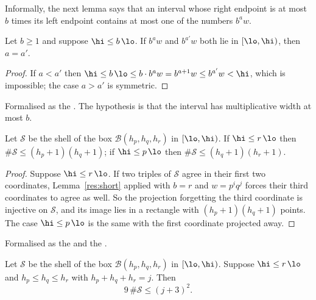 Informally, the next lemma says that an interval whose right endpoint is at
most $b$ times its left endpoint contains at most one of the numbers $b^{a}w$.

\begin{lemma}\label{res:short}
Let $b\ge1$ and suppose $\hi\le b\,\lo$.  If $b^{a}w$ and $b^{a'}w$ both lie in
$[\lo,\hi)$, then $a=a'$.
\end{lemma}

\begin{proof}
If $a<a'$ then $\hi\le b\,\lo\le b\cdot b^{a}w=b^{a+1}w\le b^{a'}w<\hi$, which
is impossible; the case $a>a'$ is symmetric.
\end{proof}

\noindent Formalised as the
.  The hypothesis is that the interval has multiplicative width at
most $b$.

\begin{proposition}\label{res:drop}
Let $\mathcal S$ be the shell of the box $\mathcal B(h_p,h_q,h_r)$ in
$[\lo,\hi)$.  If $\hi\le r\,\lo$ then $\#\mathcal S\le(h_p+1)(h_q+1)$; if
$\hi\le p\,\lo$ then $\#\mathcal S\le(h_q+1)(h_r+1)$.
\end{proposition}

\begin{proof}
Suppose $\hi\le r\,\lo$.  If two triples of $\mathcal S$ agree in their first
two coordinates, Lemma~\ref{res:short} applied with $b=r$ and $w=p^{i}q^{j}$
forces their third coordinates to agree as well.  So the projection forgetting
the third coordinate is injective on $\mathcal S$, and its image lies in a
rectangle with $(h_p+1)(h_q+1)$ points.  The case $\hi\le p\,\lo$ is the same
with the first coordinate projected away.
\end{proof}

\noindent Formalised as the
 and the
.

\begin{theorem}\label{res:shell}
Let $\mathcal S$ be the shell of the box $\mathcal B(h_p,h_q,h_r)$ in
$[\lo,\hi)$.  Suppose $\hi\le r\,\lo$ and $h_p\le h_q\le h_r$ with
$h_p+h_q+h_r=j$.  Then
\[
 9\,\#\mathcal S\le(j+3)^{2}.
\]
\end{theorem}

